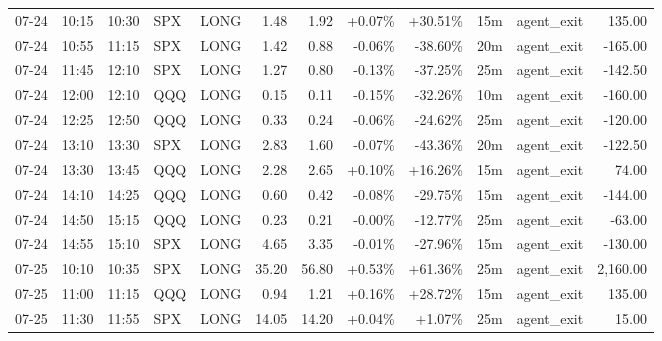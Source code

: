 \documentclass[11pt,a4paper]{article}
\begin{document}
\begin{center}
\begin{longtable}{>{\color{txtmain}}l l l l l r r r r r >{\color{txtmain}}l r}
07-24 & 10:15 & 10:30 & SPX & LONG & 1.48 & 1.92 & \textcolor{wingreen}{+0.07\%} & \textcolor{wingreen}{+30.51\%} & 15m & agent\_exit & \textcolor{wingreen}{135.00} \\
07-24 & 10:55 & 11:15 & SPX & LONG & 1.42 & 0.88 & \textcolor{lossred}{-0.06\%} & \textcolor{lossred}{-38.60\%} & 20m & agent\_exit & \textcolor{lossred}{-165.00} \\
07-24 & 11:45 & 12:10 & SPX & LONG & 1.27 & 0.80 & \textcolor{lossred}{-0.13\%} & \textcolor{lossred}{-37.25\%} & 25m & agent\_exit & \textcolor{lossred}{-142.50} \\
07-24 & 12:00 & 12:10 & QQQ & LONG & 0.15 & 0.11 & \textcolor{lossred}{-0.15\%} & \textcolor{lossred}{-32.26\%} & 10m & agent\_exit & \textcolor{lossred}{-160.00} \\
07-24 & 12:25 & 12:50 & QQQ & LONG & 0.33 & 0.24 & \textcolor{lossred}{-0.06\%} & \textcolor{lossred}{-24.62\%} & 25m & agent\_exit & \textcolor{lossred}{-120.00} \\
07-24 & 13:10 & 13:30 & SPX & LONG & 2.83 & 1.60 & \textcolor{lossred}{-0.07\%} & \textcolor{lossred}{-43.36\%} & 20m & agent\_exit & \textcolor{lossred}{-122.50} \\
07-24 & 13:30 & 13:45 & QQQ & LONG & 2.28 & 2.65 & \textcolor{wingreen}{+0.10\%} & \textcolor{wingreen}{+16.26\%} & 15m & agent\_exit & \textcolor{wingreen}{74.00} \\
07-24 & 14:10 & 14:25 & QQQ & LONG & 0.60 & 0.42 & \textcolor{lossred}{-0.08\%} & \textcolor{lossred}{-29.75\%} & 15m & agent\_exit & \textcolor{lossred}{-144.00} \\
07-24 & 14:50 & 15:15 & QQQ & LONG & 0.23 & 0.21 & \textcolor{lossred}{-0.00\%} & \textcolor{lossred}{-12.77\%} & 25m & agent\_exit & \textcolor{lossred}{-63.00} \\
07-24 & 14:55 & 15:10 & SPX & LONG & 4.65 & 3.35 & \textcolor{lossred}{-0.01\%} & \textcolor{lossred}{-27.96\%} & 15m & agent\_exit & \textcolor{lossred}{-130.00} \\
07-25 & 10:10 & 10:35 & SPX & LONG & 35.20 & 56.80 & \textcolor{wingreen}{+0.53\%} & \textcolor{wingreen}{+61.36\%} & 25m & agent\_exit & \textcolor{wingreen}{2,160.00} \\
07-25 & 11:00 & 11:15 & QQQ & LONG & 0.94 & 1.21 & \textcolor{wingreen}{+0.16\%} & \textcolor{wingreen}{+28.72\%} & 15m & agent\_exit & \textcolor{wingreen}{135.00} \\
07-25 & 11:30 & 11:55 & SPX & LONG & 14.05 & 14.20 & \textcolor{wingreen}{+0.04\%} & \textcolor{wingreen}{+1.07\%} & 25m & agent\_exit & \textcolor{wingreen}{15.00} \\

\end{longtable}
\end{center}
\end{document}
